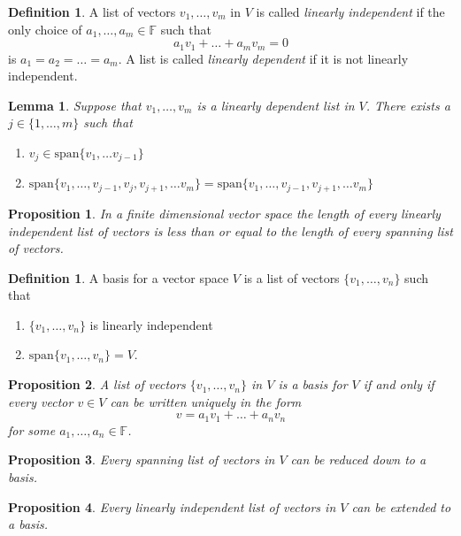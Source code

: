 \documentclass[12pt,letterpaper]{article}
\theoremstyle{plain}
\newtheorem{proposition}{Proposition}[section]
\newtheorem{lemma}[theorem]{Lemma}
\theoremstyle{definition}
\newtheorem{definition}[theorem]{Definition}
\numberwithin{equation}{section}
\begin{document}
\begin{definition} A list of vectors $v_1,\ldots, v_m$ in $V$ is called \emph{linearly independent} if the only choice of $a_1, \ldots, a_m\in \mathbb{F}$ such that 
\[a_1v_1+\ldots+a_mv_m=0\] is $a_1=a_2=\ldots =a_m$. A list is called \emph{linearly dependent} if it is not linearly independent.
\end{definition}

\begin{lemma} Suppose that $v_1,\ldots, v_m$ is a linearly dependent list in $V$. There exists a $j\in\{1,\ldots, m\}$ such that \\
\begin{enumerate}[1)]
\item $v_j\in \text{span}\{v_1,\ldots v_{j-1}\}$
\item $\text{span}\{v_1,\ldots, v_{j-1},v_j,v_{j+1},\ldots v_m\}=\text{span}\{v_1,\ldots, v_{j-1},v_{j+1},\ldots v_m\}$
\end{enumerate}
\end{lemma}

\begin{proposition} In a finite dimensional vector space the length of every linearly independent list of vectors is less than or equal to the length of every spanning list of vectors. 
\end{proposition}


\begin{definition} A basis for a vector space $V$ is a list of vectors $\{v_1, \ldots, v_n\}$ such that 
\begin{enumerate}[1.]
\item $\{v_1, \ldots, v_n\}$ is linearly independent
\item $\text{span}\{v_1, \ldots, v_n\}=V$. 
\end{enumerate}
\end{definition}
\begin{proposition} A list of vectors $\{v_1, \ldots, v_n\}$ in $V$ is a basis for $V$ if and only if every vector $v\in V$ can be written \emph{uniquely} in the form
\[v=a_1v_1+\ldots+a_nv_n\]
for some $a_1, \ldots, a_n\in \mathbb{F}$. 
\end{proposition}
\begin{proposition} Every spanning list of vectors in $V$ can be reduced down to a basis. 
\end{proposition}

\begin{proposition} Every linearly independent list of vectors in $V$ can be extended to a basis.  
\end{proposition}
\end{document}
